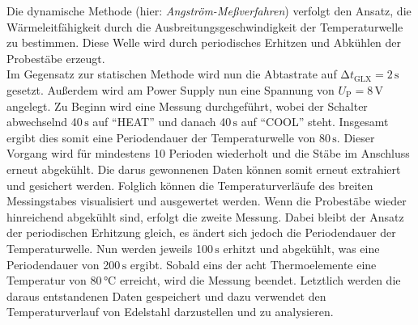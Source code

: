 Die dynamische Methode (hier: \emph{Angström-Meßverfahren}) verfolgt den Ansatz, die Wärmeleitfähigkeit durch die Ausbreitungsgeschwindigkeit der Temperaturwelle zu bestimmen. Diese Welle
wird durch periodisches Erhitzen und Abkühlen der Probestäbe erzeugt. \\ Im Gegensatz zur statischen Methode wird nun die Abtastrate auf $\increment t_\text{GLX} = 2\,\unit{\second}$ gesetzt.
Außerdem wird am Power Supply nun eine Spannung von $U_\text{P} = 8\,\unit{\volt}$ angelegt. Zu Beginn wird eine Messung durchgeführt, wobei der Schalter abwechselnd 40\,$\unit{\second}$ auf \enquote{HEAT} und danach 40\,$\unit{\second}$ auf \enquote{COOL} steht. Insgesamt ergibt dies somit eine 
Periodendauer der Temperaturwelle von 80\,$\unit{\second}$. Dieser Vorgang wird für mindestens 10 Perioden wiederholt und die Stäbe im Anschluss erneut abgekühlt. Die darus gewonnenen Daten können somit erneut extrahiert
und gesichert werden. Folglich können die Temperaturverläufe des breiten Messingstabes visualisiert und ausgewertet werden. Wenn die Probestäbe wieder hinreichend abgekühlt sind, erfolgt die zweite Messung.
Dabei bleibt der Ansatz der periodischen Erhitzung gleich, es ändert sich jedoch die Periodendauer der Temperaturwelle. Nun werden jeweils 100\,$\unit{\second}$ erhitzt und abgekühlt, was eine Periodendauer von
{200\,$\unit{\second}$} ergibt. Sobald eins der acht Thermoelemente eine Temperatur von 80\,$\unit{\celsius}$ erreicht, wird die Messung beendet. Letztlich werden die daraus entstandenen Daten gespeichert und dazu verwendet 
den Temperaturverlauf von Edelstahl darzustellen und zu analysieren.



